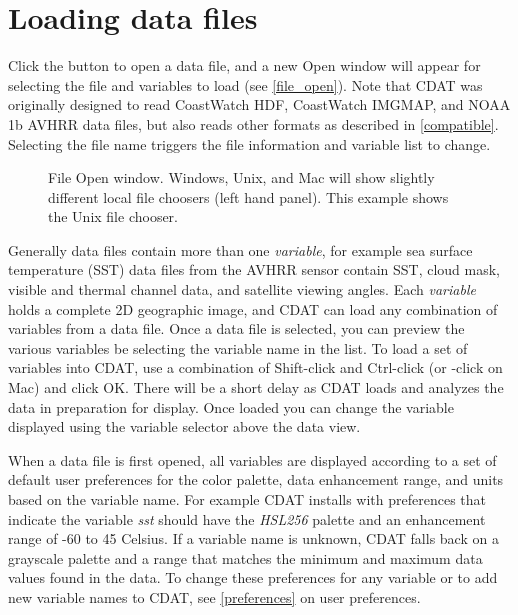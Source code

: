 \section{Loading data files}
\label{loading}

Click the  button to open a data file,
and a new {\gui Open} window will appear for selecting the file
and variables to load (see \autoref{file_open}).
Note
that CDAT was originally designed to read CoastWatch HDF,
CoastWatch IMGMAP, and NOAA 1b AVHRR data files, but also reads
other formats as described in \autoref{compatible}.
Selecting the file name
triggers the file information and variable list to change.

\begin{figure}
  \begin{center}
    \caption[File Open window]{
       File {\gui Open} window.  Windows, Unix, and Mac will show
       slightly different local file choosers (left hand panel).
       This example shows the Unix file chooser.
    }
    \label{file_open}
  \end{center}
\end{figure}

Generally data files contain more than one {\em variable}, for example
sea surface temperature (SST) data files from the AVHRR sensor contain
SST, cloud mask, visible and thermal channel data, and satellite
viewing angles.  Each {\em variable} holds a complete 2D geographic
image, and CDAT can load any combination of variables from a data
file.  Once a data file is selected, you can preview the various
variables be selecting the variable name in the list.  To load a set
of variables into CDAT, use a combination of Shift-click and
Ctrl-click (or -click on Mac) and click OK.  There
will be a short delay as CDAT loads and analyzes the data in
preparation for display.  Once loaded you can change the variable
displayed using the variable selector above the data view.

When a data file is first opened, all variables are displayed
according to a set of default user preferences for the color palette,
data enhancement range, and units based on the variable name.  For
example CDAT installs with preferences that indicate the variable {\em
sst} should have the {\em HSL256} palette and an enhancement range of
-60 to 45 Celsius.  If a variable name is unknown, CDAT falls back on
a grayscale palette and a range that matches the minimum and maximum
data values found in the data.  To change these preferences for any
variable or to add new variable names to CDAT, see
\autoref{preferences} on user preferences.

